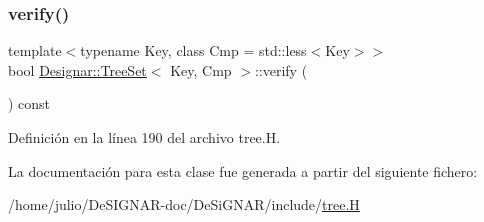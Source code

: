 \subsubsection{\texorpdfstring{verify()}{verify()}}
{\footnotesize\ttfamily template$<$typename Key, class Cmp = std\+::less$<$\+Key$>$$>$ \\
bool \hyperlink{class_designar_1_1_tree_set}{Designar\+::\+Tree\+Set}$<$ Key, Cmp $>$\+::verify (\begin{DoxyParamCaption}{ }\end{DoxyParamCaption}) const\hspace{0.3cm}{\ttfamily [inline]}}



Definición en la línea 190 del archivo tree.\+H.



La documentación para esta clase fue generada a partir del siguiente fichero\+:\begin{DoxyCompactItemize}
\item 
/home/julio/\+De\+S\+I\+G\+N\+A\+R-\/doc/\+De\+Si\+G\+N\+A\+R/include/\hyperlink{tree_8_h}{tree.\+H}\end{DoxyCompactItemize}
